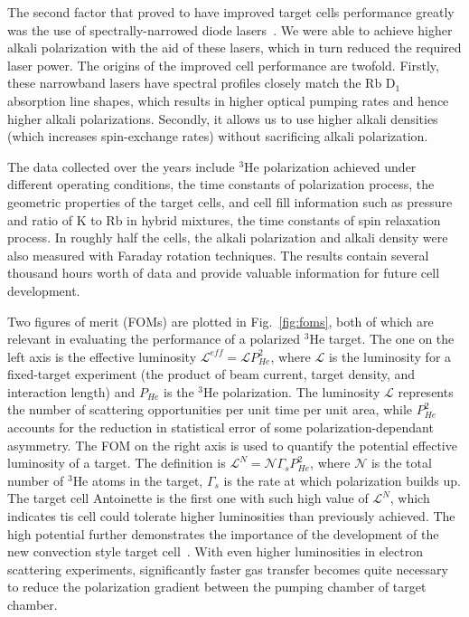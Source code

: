 The second factor that proved to have improved target cells performance greatly was the use of spectrally-narrowed diode lasers~\cite{JAP.94.6908}. We were able to achieve higher alkali polarization with the aid of these lasers, which in turn reduced the required laser power. The origins of the improved cell performance are twofold. Firstly, these narrowband lasers have spectral profiles closely match the Rb D$_{1}$ absorption line shapes, which results in higher optical pumping rates and hence higher alkali polarizations. Secondly, it allows us to use higher alkali densities (which increases spin-exchange rates) without sacrificing alkali polarization. 

The data collected over the years include $^{3}$He polarization achieved under different operating conditions, the time constants of polarization process, the geometric properties of the target cells, and cell fill information such as pressure and ratio of K to Rb in hybrid mixtures, the time constants of spin relaxation process. In roughly half the cells, the alkali polarization and alkali density were also measured with Faraday rotation techniques. The results contain several thousand hours worth of data and provide valuable information for future cell development.

Two figures of merit (FOMs) are plotted in Fig.~\ref{fig:foms}, both of which are relevant in evaluating the performance of a polarized $^{3}$He target. The one on the left axis is the effective luminosity $\mathcal{L}^{eff}=\mathcal{L}P_{He}^{2}$, where $\mathcal{L}$ is the luminosity for a fixed-target experiment (the product of beam current, target density, and interaction length) and $P_{He}$ is the $^{3}$He polarization. The luminosity $\mathcal{L}$ represents the number of scattering opportunities per unit time per unit area, while $P_{He}^{2}$ accounts for the reduction in statistical error of some polarization-dependant asymmetry. The FOM on the right axis is used to quantify the potential effective luminosity of a target. The definition is $\mathcal{L}^{N}=\mathcal{N}\Gamma_{s}P_{He}^{2}$, where $\mathcal{N}$ is the total number of $^{3}$He atoms in the target, $\Gamma_{s}$ is the rate at which polarization builds up. The target cell Antoinette is the first one with such high value of $\mathcal{L}^{N}$, which indicates tis cell could tolerate higher luminosities than previously achieved. The high potential further demonstrates the importance of the development of the new convection style target cell~\cite{PhysRevC.84.065201}. With even higher luminosities in electron scattering experiments, significantly faster gas transfer becomes quite necessary to reduce the polarization gradient between the pumping chamber of target chamber.

